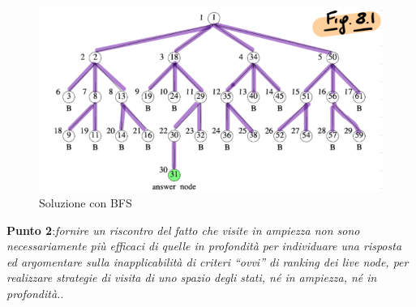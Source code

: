 \documentclass[a4paper]{article}
\begin{document}
\begin{itemize}
\newpage	
\begin{figure}[!ht]
\centering
\includegraphics[width=1\textwidth]{./img/C_2_BFS.png}
\caption{Soluzione con BFS} \label{FIG:C_2_BFS}
\end{figure}
\end{itemize}
\textbf{Punto 2}:\emph{fornire un riscontro del fatto che visite in ampiezza non sono necessariamente più efficaci di quelle in profondità per individuare una risposta ed argomentare sulla inapplicabilità di criteri “ovvi” di ranking dei live node, per realizzare strategie di visita di uno spazio degli stati, né in ampiezza, né in profondità.}.
\end{document}
